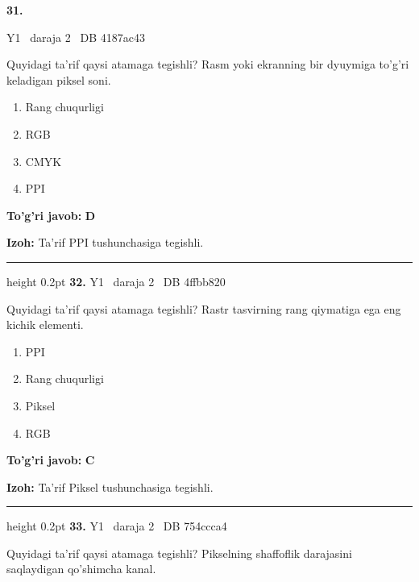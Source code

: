 \documentclass[10pt,a4paper,oneside]{article}
\begin{document}
\hypertarget{q31}{\textbf{\color{ink}31.}}  {\color{muted}\scriptsize Y1 \textbullet\ daraja 2 \textbullet\ DB 4187ac43}
\par
Quyidagi ta'rif qaysi atamaga tegishli? Rasm yoki ekranning bir dyuymiga to'g'ri keladigan piksel soni.
\begin{enumerate}[label=\Alph*),leftmargin=9mm]
\item Rang chuqurligi
\item RGB
\item CMYK
\item PPI
\end{enumerate}
\begin{tcolorbox}[enhanced,breakable,colback=teal!4,colframe=teal!45!black,boxrule=0.45pt,arc=1.2mm,left=2.8mm,right=2.8mm,top=2mm,bottom=2mm,before skip=2mm,after skip=2mm]
\textbf{\color{teal}To'g'ri javob:} \textbf{D}
\par\smallskip
\textbf{Izoh:} Ta'rif PPI tushunchasiga tegishli.
\end{tcolorbox}
\vspace{2mm}\hrule height 0.2pt \vspace{4mm}
\hypertarget{q32}{\textbf{\color{ink}32.}}  {\color{muted}\scriptsize Y1 \textbullet\ daraja 2 \textbullet\ DB 4ffbb820}
\par
Quyidagi ta'rif qaysi atamaga tegishli? Rastr tasvirning rang qiymatiga ega eng kichik elementi.
\begin{enumerate}[label=\Alph*),leftmargin=9mm]
\item PPI
\item Rang chuqurligi
\item Piksel
\item RGB
\end{enumerate}
\begin{tcolorbox}[enhanced,breakable,colback=teal!4,colframe=teal!45!black,boxrule=0.45pt,arc=1.2mm,left=2.8mm,right=2.8mm,top=2mm,bottom=2mm,before skip=2mm,after skip=2mm]
\textbf{\color{teal}To'g'ri javob:} \textbf{C}
\par\smallskip
\textbf{Izoh:} Ta'rif Piksel tushunchasiga tegishli.
\end{tcolorbox}
\vspace{2mm}\hrule height 0.2pt \vspace{4mm}
\hypertarget{q33}{\textbf{\color{ink}33.}}  {\color{muted}\scriptsize Y1 \textbullet\ daraja 2 \textbullet\ DB 754ccca4}
\par
Quyidagi ta'rif qaysi atamaga tegishli? Pikselning shaffoflik darajasini saqlaydigan qo'shimcha kanal.
\end{document}
